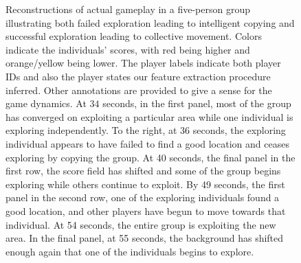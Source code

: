 \documentclass[12pt,letterpaper]{article}
\begin{document}
\begin{figure}
  \caption{Reconstructions of actual gameplay in a five-person group
    illustrating both failed exploration leading to intelligent
    copying and successful exploration leading to collective
    movement. Colors indicate the individuals' scores, with red being
    higher and orange/yellow being lower.  The player labels indicate
    both player IDs and also the player states our feature extraction
    procedure inferred.  Other annotations are provided to give a
    sense for the game dynamics.  At $34$ seconds, in the first panel,
    most of the group has converged on exploiting a particular area
    while one individual is exploring independently.  To the right, at
    36 seconds, the exploring individual appears to have failed to
    find a good location and ceases exploring by copying the group.
    At 40 seconds, the final panel in the first row, the score field
    has shifted and some of the group begins exploring while others
    continue to exploit.  By 49 seconds, the first panel in the second
    row, one of the exploring individuals found a good location, and
    other players have begun to move towards that individual.  At 54
    seconds, the entire group is exploiting the new area.  In the
    final panel, at 55 seconds, the background has shifted enough
    again that one of the individuals begins to explore.}
  \label{fig:example}
\end{figure}
\end{document}
